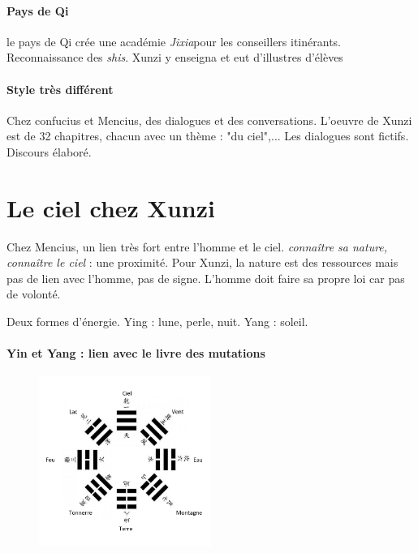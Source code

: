 \paragraph{Pays de Qi} le pays de Qi crée une académie  \textit{Jixia}pour les conseillers itinérants. Reconnaissance des \textit{shis}. Xunzi y enseigna et eut d'illustres d'élèves




\paragraph{Style très différent} Chez confucius et Mencius, des dialogues et des conversations. L'oeuvre de Xunzi est de 32 chapitres, chacun avec un thème : "du ciel",... Les dialogues sont fictifs. Discours élaboré.

\section{Le ciel chez Xunzi}

\begin{Prop}
    Chez Mencius, un lien très fort entre l'homme et le ciel. \textit{connaître sa nature, connaître le ciel} : une proximité. 
    Pour Xunzi, la nature est des ressources mais pas de lien avec l'homme, pas de signe. L'homme doit faire sa propre loi car pas de volonté.
\end{Prop}


\begin{Def}
    Deux formes d'énergie. Ying : lune, perle, nuit. Yang : soleil.
\end{Def}


\paragraph{Yin et Yang : lien avec le livre des mutations}
 \begin{figure}[!h]
    \centering
    \includegraphics[width=0.5\textwidth]{ConfucianismeTaoismeBouddhismeChinois/Images/YinYangmutations.png}

    \label{fig:enter-label}
\end{figure}


